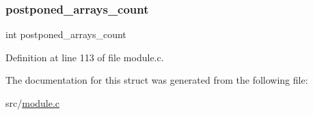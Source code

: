 \subsubsection{\texorpdfstring{postponed\+\_\+arrays\+\_\+count}{postponed\_arrays\_count}}
{\footnotesize\ttfamily int postponed\+\_\+arrays\+\_\+count}



Definition at line 113 of file module.\+c.



The documentation for this struct was generated from the following file\+:\begin{DoxyCompactItemize}
\item 
src/\hyperlink{module_8c}{module.\+c}\end{DoxyCompactItemize}
